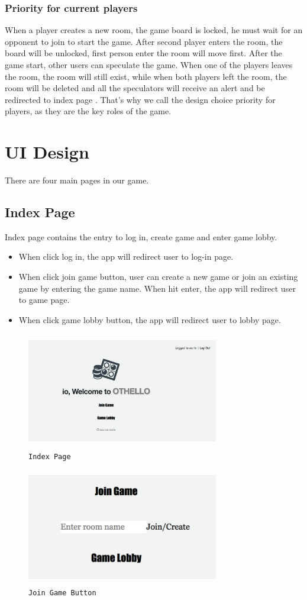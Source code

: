 \subsubsection{Priority for current players}
When a player creates a new room, the game board is locked, he must wait for an
opponent to join to start the game. After second player enters the room, the board
will be unlocked, first person enter the room will move first. After the game 
start, other users can speculate the game. When one of the players leaves the 
room, the room will still exist, while when both players left the room, the 
room will be deleted and all the speculators will receive an alert and be 
redirected to index page . That's why we call the design choice priority for 
players, as they are the key roles of the game.

\section{UI Design}
There are four main pages in our game.
\subsection{Index Page}
Index page contains the entry to log in, create game and enter game lobby.
\begin{itemize}
\item When click log in, the app will redirect user to log-in page.
\item When click join game button, user can create a new game or join an 
existing game by entering the game name. When hit enter, the app will redirect
user to game page.
\item When click game lobby button, the app will redirect user to lobby page.
\end{itemize}
\begin{figure}[!htb]
\includegraphics[height=2.0in, width=3.3in]{index.png}
\caption{\texttt{Index Page}}
\end{figure}
\begin{figure}[!htb]
\includegraphics[height=2.0in, width=3.3in]{index2.png}
\caption{\texttt{Join Game Button}}
\end{figure}

